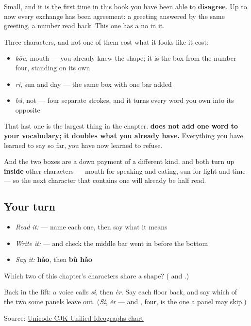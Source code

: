 Small, and it is the first time in this book you have been able to \textbf{disagree}. Up to now every exchange has been agreement: a greeting answered by the same greeting, a number read back. This one has a no in it.

\begin{grammarlens}[title={What you've built this chapter}]
Three characters, and not one of them cost what it looks like it cost:

\begin{itemize}
\raggedright
  \item \textbf{} \emph{kǒu}, mouth — you already knew the shape; it is the box from the number four, standing on its own
  \item \textbf{} \emph{rì}, sun and day — the same box with one bar added
  \item \textbf{} \emph{bù}, not — four separate strokes, and it turns every word you own into its opposite
\end{itemize}

That last one is the largest thing in the chapter. \textbf{ does not add one word to your vocabulary; it doubles what you already have.} Everything you have learned to say so far, you have now learned to refuse.

And the two boxes are a down payment of a different kind.  and  both turn up \textbf{inside} other characters — mouth for speaking and eating, sun for light and time — so the next character that contains one will already be half read.
\end{grammarlens}

\subsection*{Your turn}
\begin{itemize}
\raggedright
  \item \emph{Read it:}    — name each one, then say what it means
  \item \emph{Write it:}  — and check the middle bar went in before the bottom
  \item \emph{Say it:} \textbf{hǎo}, then \textbf{bù hǎo}
\end{itemize}

\begin{tcolorbox}[breakable,colback=teal!4,colframe=teal!35!black,title={Before you move on}]
Which two of this chapter's characters share a shape? (\textbf{} and \textbf{}.)

Back in the lift: a voice calls \emph{sì}, then \emph{èr}. Say each floor back, and say which of the two some panels leave out. (\emph{Sì}, \emph{èr} — and \textbf{}, four, is the one a panel may skip.)

Source: \href{https://www.unicode.org/charts/PDF/U4E00.pdf}{Unicode CJK Unified Ideographs chart}
\end{tcolorbox}
